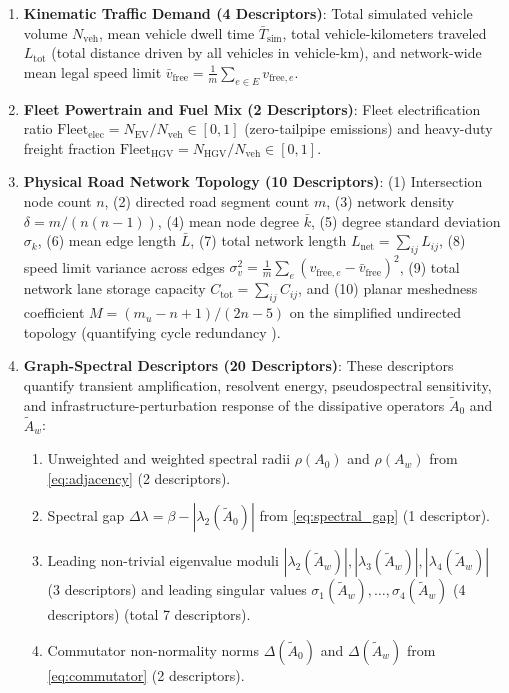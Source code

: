 \documentclass[journal]{IEEEtran}
\begin{document}
\begin{enumerate}
    \item \textbf{Kinematic Traffic Demand (4 Descriptors)}: Total simulated vehicle volume $N_{\text{veh}}$, mean vehicle dwell time $\bar{T}_{\text{sim}}$, total vehicle-kilometers traveled $L_{\text{tot}}$ (total distance driven by all vehicles in vehicle-km), and network-wide mean legal speed limit $\bar{v}_{\text{free}} = \frac{1}{m} \sum_{e \in E} v_{\text{free}, e}$.
    \item \textbf{Fleet Powertrain and Fuel Mix (2 Descriptors)}: Fleet electrification ratio $\text{Fleet}_{\text{elec}} = N_{\text{EV}} / N_{\text{veh}} \in [0, 1]$ (zero-tailpipe emissions) and heavy-duty freight fraction $\text{Fleet}_{\text{HGV}} = N_{\text{HGV}} / N_{\text{veh}} \in [0, 1]$.
    \item \textbf{Physical Road Network Topology (10 Descriptors)}: (1) Intersection node count $n$, (2) directed road segment count $m$, (3) network density $\delta = m / (n(n-1))$, (4) mean node degree $\bar{k}$, (5) degree standard deviation $\sigma_k$, (6) mean edge length $\bar{L}$, (7) total network length $L_{\text{net}} = \sum_{ij} L_{ij}$, (8) speed limit variance across edges $\sigma_v^2 = \frac{1}{m} \sum_{e} (v_{\text{free}, e} - \bar{v}_{\text{free}})^2$, (9) total network lane storage capacity $C_{\text{tot}} = \sum_{ij} C_{ij}$, and (10) planar meshedness coefficient $M = (m_u - n + 1) / (2n - 5)$ on the simplified undirected topology (quantifying cycle redundancy \cite{Barthelemy2011}).
    \item \textbf{Graph-Spectral Descriptors (20 Descriptors)}: These descriptors quantify transient amplification, resolvent energy, pseudospectral sensitivity, and infrastructure-perturbation response of the dissipative operators $\tilde{A}_0$ and $\tilde{A}_w$:
    \begin{enumerate}
        \item Unweighted and weighted spectral radii $\rho(A_0)$ and $\rho(A_w)$ from \eqref{eq:adjacency} (2 descriptors).
        \item Spectral gap $\Delta\lambda = \beta - |\lambda_2(\tilde{A}_0)|$ from \eqref{eq:spectral_gap} (1 descriptor).
        \item Leading non-trivial eigenvalue moduli $|\lambda_2(\tilde{A}_w)|, |\lambda_3(\tilde{A}_w)|, |\lambda_4(\tilde{A}_w)|$ (3 descriptors) and leading singular values $\sigma_1(\tilde{A}_w), \dots, \sigma_4(\tilde{A}_w)$ (4 descriptors) (total 7 descriptors).
        \item Commutator non-normality norms $\Delta(\tilde{A}_0)$ and $\Delta(\tilde{A}_w)$ from \eqref{eq:commutator} (2 descriptors).

\end{enumerate}
\end{enumerate}
\end{document}
